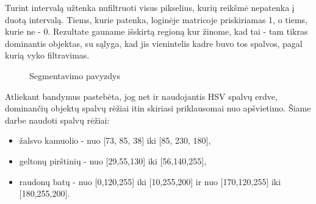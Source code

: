 \documentclass{VUMIFPSbakalaurinis}
\begin{document}
Turint intervalą užtenka nufiltruoti visus pikselius, kurių reikšmė nepatenka į duotą intervalą. Tiems, kurie patenka, loginėje matricoje priskiriamas 1, o tiems, kurie ne - 0. Rezultate gauname išskirtą regioną kur žinome, kad tai - tam tikras dominantis objektas, su sąlyga, kad jis vienintelis kadre buvo tos spalvos, pagal kurią vyko filtravimas. 
\begin{figure}[H]
	\centering
	\qquad
	\caption{Segmentavimo pavyzdys}
	\label{fig:example}
\end{figure}

Atliekant bandymus pastebėta, jog net ir naudojantis HSV spalvų erdve, dominančių objektų spalvų rėžiai itin skiriasi priklausomai nuo apšvietimo. Šiame darbe naudoti spalvų rėžiai:

\begin{itemize} 
	\item žalsvo kamuolio - nuo [73, 85, 38] iki [85, 230, 180],
	\item geltonų pirštinių - nuo [29,55,130] iki [56,140,255],
	\item raudonų batų - nuo [0,120,255] iki [10,255,200] ir nuo [170,120,255] iki [180,255,200].
\end{itemize}
\end{document}
